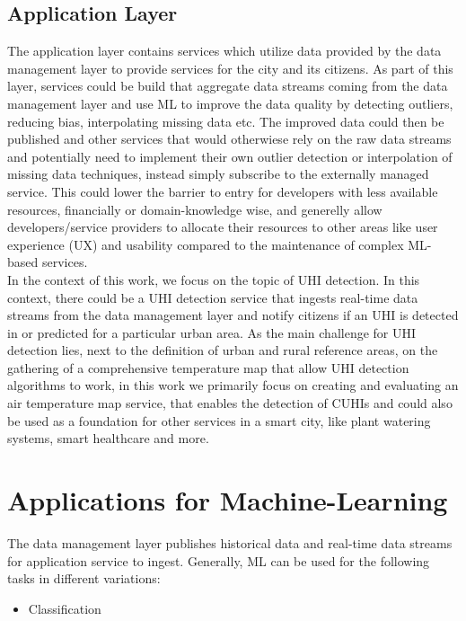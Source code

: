 \subsection{Application Layer}

The application layer contains services which utilize data provided by the data management layer to provide services for the city and its citizens. As part of this layer, services could be build that aggregate data streams coming from the data management layer and use ML to improve the data quality by detecting outliers, reducing bias, interpolating missing data etc. The improved data could then be published and other services that would otherwiese rely on the raw data streams and potentially need to implement their own outlier detection or interpolation of missing data techniques, instead simply subscribe to the externally managed service. This could lower the barrier to entry for developers with less available resources, financially or domain-knowledge wise, and generelly allow developers/service providers to allocate their resources to other areas like user experience (UX) and usability compared to the maintenance of complex ML-based services.\\
In the context of this work, we focus on the topic of UHI detection. In this context, there could be a UHI detection service that ingests real-time data streams from the data management layer and notify citizens if an UHI is detected in or predicted for a particular urban area. As the main challenge for UHI detection lies, next to the definition of urban and rural reference areas, on the gathering of a comprehensive temperature map that allow UHI detection algorithms to work, in this work we primarily focus on creating and evaluating an air temperature map service, that enables the detection of CUHIs and could also be used as a foundation for other services in a smart city, like plant watering systems, smart healthcare and more.

\section{Applications for Machine-Learning}

The data management layer publishes historical data and real-time data streams for application service to ingest. Generally, ML can be used for the following tasks in different variations:

\begin{itemize}
    \item Classification
\end{itemize}

